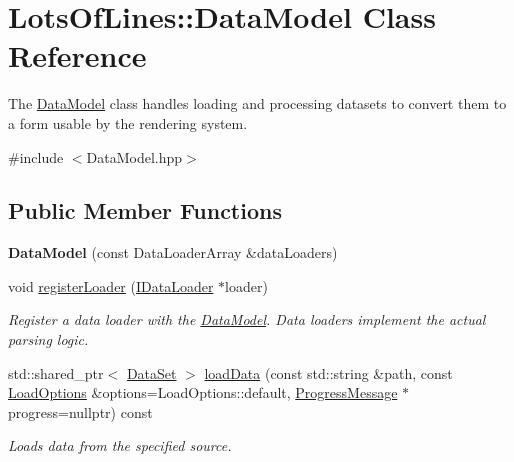 \hypertarget{class_lots_of_lines_1_1_data_model}{}\section{Lots\+Of\+Lines\+:\+:Data\+Model Class Reference}
\label{class_lots_of_lines_1_1_data_model}


The \hyperlink{class_lots_of_lines_1_1_data_model}{Data\+Model} class handles loading and processing datasets to convert them to a form usable by the rendering system.  




{\ttfamily \#include $<$Data\+Model.\+hpp$>$}

\subsection*{Public Member Functions}
\begin{DoxyCompactItemize}
\item 
{\bfseries Data\+Model} (const Data\+Loader\+Array \&data\+Loaders)\hypertarget{class_lots_of_lines_1_1_data_model_ad16cc6c51af644c4109ce088d50c6863}{}\label{class_lots_of_lines_1_1_data_model_ad16cc6c51af644c4109ce088d50c6863}

\item 
void \hyperlink{class_lots_of_lines_1_1_data_model_a6a98b1f57a88705c93fd62e439ae0d1b}{register\+Loader} (\hyperlink{class_lots_of_lines_1_1_i_data_loader}{I\+Data\+Loader} $\ast$loader)\hypertarget{class_lots_of_lines_1_1_data_model_a6a98b1f57a88705c93fd62e439ae0d1b}{}\label{class_lots_of_lines_1_1_data_model_a6a98b1f57a88705c93fd62e439ae0d1b}

\begin{DoxyCompactList}\small\item\em Register a data loader with the \hyperlink{class_lots_of_lines_1_1_data_model}{Data\+Model}. Data loaders implement the actual parsing logic. \end{DoxyCompactList}\item 
std\+::shared\+\_\+ptr$<$ \hyperlink{class_lots_of_lines_1_1_data_set}{Data\+Set} $>$ \hyperlink{class_lots_of_lines_1_1_data_model_ab8b8b52feec4ea1331d3efcbe000b148}{load\+Data} (const std\+::string \&path, const \hyperlink{struct_lots_of_lines_1_1_load_options}{Load\+Options} \&options=Load\+Options\+::default, \hyperlink{class_lots_of_lines_1_1_progress_message}{Progress\+Message} $\ast$progress=nullptr) const 
\begin{DoxyCompactList}\small\item\em Loads data from the specified source. \end{DoxyCompactList}\end{DoxyCompactItemize}


